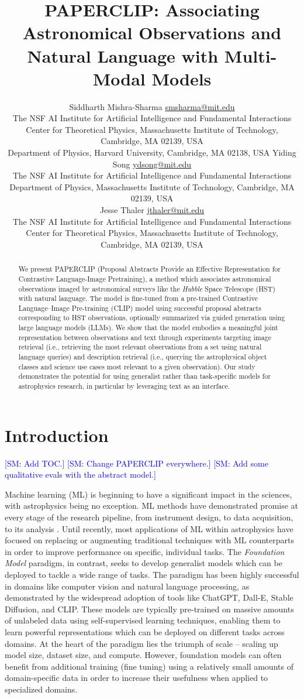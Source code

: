 \documentclass[10pt]{article} %
\title{\textsc{PAPERCLIP}: Associating Astronomical Observations and Natural Language with Multi-Modal Models}
\author{\name Siddharth Mishra-Sharma \email \href{mailto:smsharma@mit.edu}{smsharma@mit.edu} \\
      \addr The NSF AI Institute for Artificial Intelligence and Fundamental Interactions\\
      Center for Theoretical Physics, Massachusetts Institute of Technology, Cambridge, MA 02139, USA \\
      Department of Physics, Harvard University, Cambridge, MA 02138, USA
      \AND
      \name Yiding Song \email \href{mailto:ydsong@mit.edu}{ydsong@mit.edu} \\
      \addr The NSF AI Institute for Artificial Intelligence and Fundamental Interactions\\
      Department of Physics, Massachusetts Institute of Technology, Cambridge, MA 02139, USA \\
      \AND
      \name Jesse Thaler \email \href{mailto:jthaler@mit.edu}{jthaler@mit.edu} \\
      \addr The NSF AI Institute for Artificial Intelligence and Fundamental Interactions\\
      Center for Theoretical Physics, Massachusetts Institute of Technology, Cambridge, MA 02139, USA \\
}
\newcommand{\SM}[1]{\textcolor{blue}{[SM: #1]}}
\newcommand{\hubble}{\emph{Hubble}\xspace}
\begin{document}
\maketitle

\thispagestyle{firstpage}

\begin{abstract}
We present PAPERCLIP (Proposal Abstracts Provide an Effective Representation for Contrastive Language-Image Pretraining), a method which associates astronomical observations imaged by astronomical surveys like the \hubble Space Telescope (HST) with natural language. The model is fine-tuned from a pre-trained Contrastive Language–Image Pre-training (CLIP) model using successful proposal abstracts corresponding to HST observations, optionally summarized via guided generation using large language models (LLMs). We show that the model embodies a meaningful joint representation between observations and text through experiments targeting image retrieval (i.e., retrieving the most relevant observations from a set using natural language queries) and description retrieval (i.e., querying the astrophysical object classes and science use cases most relevant to a given observation). Our study demonstrates the potential for using generalist rather than task-specific models for astrophysics research, in particular by leveraging text as an interface.
\end{abstract}

\section{Introduction}
\label{sec:intro}

\SM{Add TOC.}
\SM{Change PAPERCLIP everywhere.}
\SM{Add some qualitative evals with the abstract model.}

Machine learning (ML) is beginning to have a significant impact in the sciences, with astrophysics being no exception.
%
ML methods have demonstrated promise at every stage of the research pipeline, from instrument design, to data acquisition, to its analysis \citep{huertas2022dawes}.
%
Until recently, most applications of ML within astrophysics have focused on replacing or augmenting traditional techniques with ML counterparts in order to improve performance on specific, individual tasks.
%
The \emph{Foundation Model} paradigm, in contrast, seeks to develop generalist models which can be deployed to tackle a wide range of tasks.
%
The paradigm has been highly successful in domains like computer vision and natural language processing, as demonstrated by the widespread adoption of tools like ChatGPT, Dall-E, Stable Diffusion, and CLIP.
%
These models are typically pre-trained on massive amounts of unlabeled data using self-supervised learning techniques, enabling them to learn powerful representations which can be deployed on different tasks across domains.
%
At the heart of the paradigm lies the triumph of scale -- scaling up model size, dataset size, and compute.
%
However, foundation models can often benefit from additional training ({fine tuning}) using a relatively small amounts of domain-specific data in order to increase their usefulness when applied to specialized domains.
\end{document}
